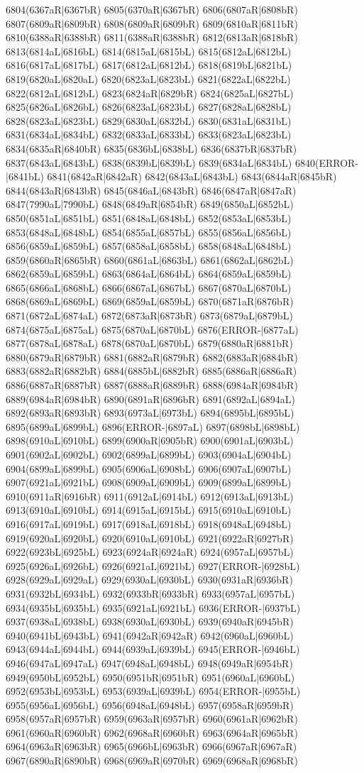 6804(6367aR|6367bR) 6805(6370aR|6367bR) 6806(6807aR|6808bR) 6807(6809aR|6809bR) 6808(6809aR|6809bR) 6809(6810aR|6811bR) 6810(6388aR|6388bR) 6811(6388aR|6388bR) 6812(6813aR|6818bR) 6813(6814aL|6816bL) 6814(6815aL|6815bL) 6815(6812aL|6812bL) 6816(6817aL|6817bL) 6817(6812aL|6812bL) 6818(6819bL|6821bL) 6819(6820aL|6820aL) 6820(6823aL|6823bL) 6821(6822aL|6822bL) 6822(6812aL|6812bL) 6823(6824aR|6829bR) 6824(6825aL|6827bL) 6825(6826aL|6826bL) 6826(6823aL|6823bL) 6827(6828aL|6828bL) 6828(6823aL|6823bL) 6829(6830aL|6832bL) 6830(6831aL|6831bL) 6831(6834aL|6834bL) 6832(6833aL|6833bL) 6833(6823aL|6823bL) 6834(6835aR|6840bR) 6835(6836bL|6838bL) 6836(6837bR|6837bR) 6837(6843aL|6843bL) 6838(6839bL|6839bL) 6839(6834aL|6834bL) 6840(ERROR-|6841bL) 6841(6842aR|6842aR) 6842(6843aL|6843bL) 6843(6844aR|6845bR) 6844(6843aR|6843bR) 6845(6846aL|6843bR) 6846(6847aR|6847aR) 6847(7990aL|7990bL) 6848(6849aR|6854bR) 6849(6850aL|6852bL) 6850(6851aL|6851bL) 6851(6848aL|6848bL) 6852(6853aL|6853bL) 6853(6848aL|6848bL) 6854(6855aL|6857bL) 6855(6856aL|6856bL) 6856(6859aL|6859bL) 6857(6858aL|6858bL) 6858(6848aL|6848bL) 6859(6860aR|6865bR) 6860(6861aL|6863bL) 6861(6862aL|6862bL) 6862(6859aL|6859bL) 6863(6864aL|6864bL) 6864(6859aL|6859bL) 6865(6866aL|6868bL) 6866(6867aL|6867bL) 6867(6870aL|6870bL) 6868(6869aL|6869bL) 6869(6859aL|6859bL) 6870(6871aR|6876bR) 6871(6872aL|6874aL) 6872(6873aR|6873bR) 6873(6879aL|6879bL) 6874(6875aL|6875aL) 6875(6870aL|6870bL) 6876(ERROR-|6877aL) 6877(6878aL|6878aL) 6878(6870aL|6870bL) 6879(6880aR|6881bR) 6880(6879aR|6879bR) 6881(6882aR|6879bR) 6882(6883aR|6884bR) 6883(6882aR|6882bR) 6884(6885bL|6882bR) 6885(6886aR|6886aR) 6886(6887aR|6887bR) 6887(6888aR|6889bR) 6888(6984aR|6984bR) 6889(6984aR|6984bR) 6890(6891aR|6896bR) 6891(6892aL|6894aL) 6892(6893aR|6893bR) 6893(6973aL|6973bL) 6894(6895bL|6895bL) 6895(6899aL|6899bL) 6896(ERROR-|6897aL) 6897(6898bL|6898bL) 6898(6910aL|6910bL) 6899(6900aR|6905bR) 6900(6901aL|6903bL) 6901(6902aL|6902bL) 6902(6899aL|6899bL) 6903(6904aL|6904bL) 6904(6899aL|6899bL) 6905(6906aL|6908bL) 6906(6907aL|6907bL) 6907(6921aL|6921bL) 6908(6909aL|6909bL) 6909(6899aL|6899bL) 6910(6911aR|6916bR) 6911(6912aL|6914bL) 6912(6913aL|6913bL) 6913(6910aL|6910bL) 6914(6915aL|6915bL) 6915(6910aL|6910bL) 6916(6917aL|6919bL) 6917(6918aL|6918bL) 6918(6948aL|6948bL) 6919(6920aL|6920bL) 6920(6910aL|6910bL) 6921(6922aR|6927bR) 6922(6923bL|6925bL) 6923(6924aR|6924aR) 6924(6957aL|6957bL) 6925(6926aL|6926bL) 6926(6921aL|6921bL) 6927(ERROR-|6928bL) 6928(6929aL|6929aL) 6929(6930aL|6930bL) 6930(6931aR|6936bR) 6931(6932bL|6934bL) 6932(6933bR|6933bR) 6933(6957aL|6957bL) 6934(6935bL|6935bL) 6935(6921aL|6921bL) 6936(ERROR-|6937bL) 6937(6938aL|6938bL) 6938(6930aL|6930bL) 6939(6940aR|6945bR) 6940(6941bL|6943bL) 6941(6942aR|6942aR) 6942(6960aL|6960bL) 6943(6944aL|6944bL) 6944(6939aL|6939bL) 6945(ERROR-|6946bL) 6946(6947aL|6947aL) 6947(6948aL|6948bL) 6948(6949aR|6954bR) 6949(6950bL|6952bL) 6950(6951bR|6951bR) 6951(6960aL|6960bL) 6952(6953bL|6953bL) 6953(6939aL|6939bL) 6954(ERROR-|6955bL) 6955(6956aL|6956bL) 6956(6948aL|6948bL) 6957(6958aR|6959bR) 6958(6957aR|6957bR) 6959(6963aR|6957bR) 6960(6961aR|6962bR) 6961(6960aR|6960bR) 6962(6968aR|6960bR) 6963(6964aR|6965bR) 6964(6963aR|6963bR) 6965(6966bL|6963bR) 6966(6967aR|6967aR) 6967(6890aR|6890bR) 6968(6969aR|6970bR) 6969(6968aR|6968bR) 